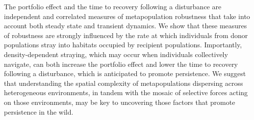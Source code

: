 \documentclass{revtex4}
\begin{document}

The portfolio effect and the time to recovery following a disturbance are independent and correlated measures of metapopulation robustness that take into account both steady state and transient dynamics.
We show that these measures of robustness are strongly influenced by the rate at which individuals from donor populations stray into habitats occupied by recipient populations. 
Importantly, density-dependent straying, which may occur when individuals collectively navigate, can both increase the portfolio effect and lower the time to recovery following a disturbance, which is anticipated to promote persistence. 
We suggest that understanding the spatial complexity of metapopulations dispersing across heterogeneous environments, in tandem with the mosaic of selective forces acting on those environments, may be key to uncovering those factors that promote persistence in the wild.
\\ \\



% 
% 
\end{document}
